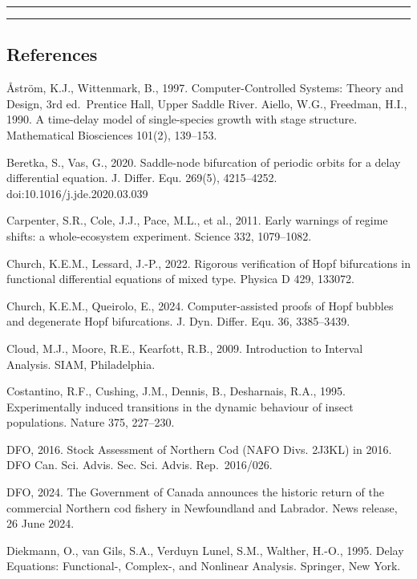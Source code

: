 \documentclass[11pt]{article}
\begin{document}
\begin{center}\rule{0.5\linewidth}{0.5pt}\end{center}

\begin{center}\rule{0.5\linewidth}{0.5pt}\end{center}

\subsection{References}\label{references}

\AA{}str\"om, K.J., Wittenmark, B., 1997. Computer-Controlled Systems: Theory
and Design, 3rd ed.~Prentice Hall, Upper Saddle River. Aiello, W.G.,
Freedman, H.I., 1990. A time-delay model of single-species growth with
stage structure. Mathematical Biosciences 101(2), 139--153.

Beretka, S., Vas, G., 2020. Saddle-node bifurcation of periodic orbits
for a delay differential equation. J. Differ. Equ. 269(5), 4215--4252.
doi:10.1016/j.jde.2020.03.039

Carpenter, S.R., Cole, J.J., Pace, M.L., et al., 2011. Early warnings of
regime shifts: a whole-ecosystem experiment. Science 332, 1079--1082.

Church, K.E.M., Lessard, J.-P., 2022. Rigorous verification of Hopf
bifurcations in functional differential equations of mixed type. Physica
D 429, 133072.

Church, K.E.M., Queirolo, E., 2024. Computer-assisted proofs of Hopf
bubbles and degenerate Hopf bifurcations. J. Dyn. Differ. Equ. 36,
3385--3439.

Cloud, M.J., Moore, R.E., Kearfott, R.B., 2009. Introduction to Interval
Analysis. SIAM, Philadelphia.

Costantino, R.F., Cushing, J.M., Dennis, B., Desharnais, R.A., 1995.
Experimentally induced transitions in the dynamic behaviour of insect
populations. Nature 375, 227--230.

DFO, 2016. Stock Assessment of Northern Cod (NAFO Divs. 2J3KL) in 2016.
DFO Can. Sci. Advis. Sec. Sci. Advis. Rep.~2016/026.

DFO, 2024. The Government of Canada announces the historic return of the
commercial Northern cod fishery in Newfoundland and Labrador. News
release, 26 June 2024.

Diekmann, O., van Gils, S.A., Verduyn Lunel, S.M., Walther, H.-O., 1995.
Delay Equations: Functional-, Complex-, and Nonlinear Analysis.
Springer, New York.
\end{document}
